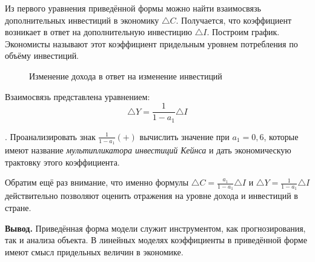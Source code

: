\documentclass[12pt,a4paper]{article}
\begin{document}
Из первого уравнения приведённой формы можно найти взаимосвязь дополнительных инвестиций в экономику $\triangle C$. Получается, что коэффициент возникает в ответ на дополнительную инвестицию $\triangle I$. Построим график. Экономисты называют этот коэффициент придельным уровнем потребления по объёму инвестиций.

\begin{figure}[H]
\begin{center}
\caption{Изменение дохода в ответ на изменение инвестиций}
\end{center}
\end{figure}

Взаимосвязь представлена уравнением:
\begin{equation}
\triangle Y = \displaystyle{\frac{1}{1-a_1} \triangle I}
\end{equation}

. Проанализировать знак $\displaystyle{\frac{1}{1-a_1}} (+)$ вычислить значение при $a_1 = 0,6$, которые имеют название \textit{мультипликатора инвестиций Кейнса} и дать экономическую трактовку этого коэффициента.

Обратим ещё раз внимание, что именно формулы $\triangle C = \displaystyle{\frac{a_1}{1-a_1} \triangle I}$ и $\triangle Y = \displaystyle{\frac{1}{1-a_1} \triangle I}$ действительно позволяют оценить отражения на уровне дохода и инвестиций в стране.

\textbf{Вывод.} Приведённая форма модели служит инструментом, как прогнозирования, так и анализа объекта. В линейных моделях коэффициенты в приведённой форме имеют смысл придельных величин в экономике.
\end{document}
